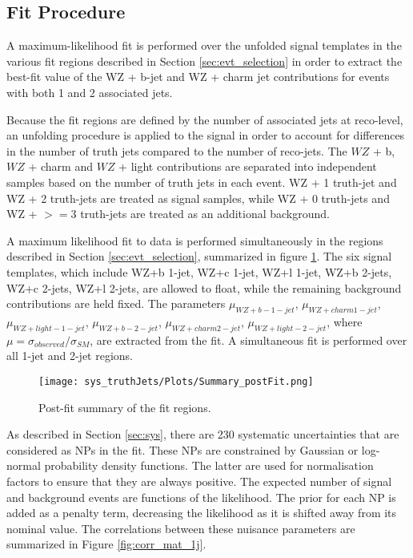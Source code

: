 
\subsection{Fit Procedure}
\label{sec:fit}

A maximum-likelihood fit is performed over the unfolded signal templates in the various fit regions described in Section \ref{sec:evt_selection} in order to extract the best-fit value of the WZ + b-jet and WZ + charm jet contributions for events with both 1 and 2 associated jets.

Because the fit regions are defined by the number of associated jets at reco-level, an unfolding procedure is applied to the signal in order to account for differences in the number of truth jets compared to the number of reco-jets. The $WZ$ + b, $WZ$ + charm and $WZ$ + light contributions are separated into independent samples based on the number of truth jets in each event. WZ + 1 truth-jet and WZ + 2 truth-jets are treated as signal samples, while WZ + 0 truth-jets and WZ + $>=$3 truth-jets are treated as an additional background. 

A maximum likelihood fit to data is performed simultaneously in the regions described in Section \ref{sec:evt_selection}, summarized in figure \ref{fig:summary}. The six signal templates, which include WZ+b 1-jet, WZ+c 1-jet, WZ+l 1-jet, WZ+b 2-jets, WZ+c 2-jets, WZ+l 2-jets, are allowed to float, while the remaining background contributions are held fixed. The parameters $\mu_{WZ+b - 1-jet}$, $\mu_{WZ+charm 1-jet}$, $\mu_{WZ+light - 1-jet}$, $\mu_{WZ+b - 2-jet}$, $\mu_{WZ+charm 2-jet}$, $\mu_{WZ+light - 2-jet}$, where $\mu = \sigma_{observed}/\sigma_{SM} $, are extracted from the fit. A simultaneous fit is performed over all 1-jet and 2-jet regions.

\begin{figure}[H]
  \center                                                                                                                    
  \texttt{[image: sys\_truthJets/Plots/Summary\_postFit.png]}
  \caption{Post-fit summary of the fit regions.}
  \label{fig:summary}
\end{figure}

As described in Section \ref{sec:sys}, there are 230 systematic uncertainties that are considered as NPs in the fit. These NPs are constrained by Gaussian or log-normal probability density functions. The latter are used for normalisation factors to ensure that they are always positive. The expected number of signal and background events are functions of the likelihood. The prior for each NP is added as a penalty term, decreasing the likelihood as it is shifted away from its nominal value. The correlations between these nuisance parameters are summarized in Figure \ref{fig:corr_mat_1j}. 

